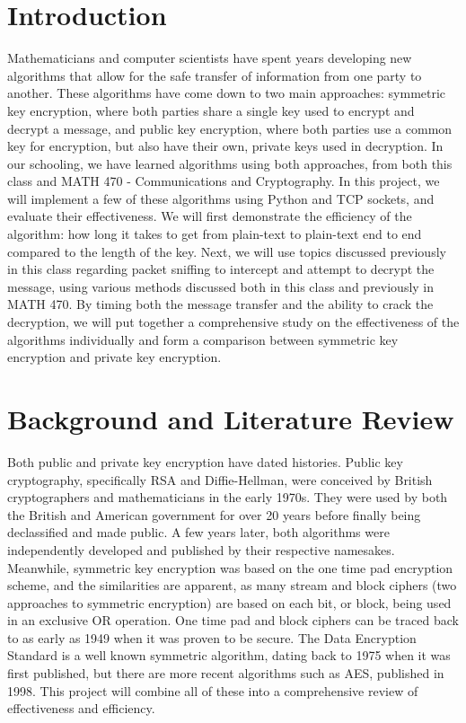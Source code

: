 \documentclass[12pt]{report}
\begin{document}
\section{Introduction}
Mathematicians and computer scientists have spent years developing new algorithms that allow for the safe transfer of information from one party to another. These algorithms have come down to two main approaches: symmetric key encryption, where both parties share a single key used to encrypt and decrypt a message, and public key encryption, where both parties use a common key for encryption, but also have their own, private keys used in decryption. In our schooling, we have learned algorithms using both approaches, from both this class and MATH 470 - Communications and Cryptography. In this project, we will implement a few of these algorithms using Python and TCP sockets, and evaluate their effectiveness. We will first demonstrate the efficiency of the algorithm: how long it takes to get from plain-text to plain-text end to end compared to the length of the key. Next, we will use topics discussed previously in this class regarding packet sniffing to intercept and attempt to decrypt the message, using various methods discussed both in this class and previously in MATH 470. By timing both the message transfer and the ability to crack the decryption, we will put together a comprehensive study on the effectiveness of the algorithms individually and form a comparison between symmetric key encryption and private key encryption.

\section{Background and Literature Review}
Both public and private key encryption have dated histories. Public key cryptography, specifically RSA and Diffie-Hellman, were conceived by British cryptographers and mathematicians in the early 1970s. They were used by both the British and American government for over 20 years before finally being declassified and made public. A few years later, both algorithms were independently developed and published by their respective namesakes. \\
Meanwhile, symmetric key encryption was based on the one time pad encryption scheme, and the similarities are apparent, as many stream and block ciphers (two approaches to symmetric encryption) are based on each bit, or block, being used in an exclusive OR operation. One time pad and block ciphers can be traced back to as early as 1949 when it was proven to be secure. The Data Encryption Standard is a well known symmetric algorithm, dating back to 1975 when it was first published, but there are more recent algorithms such as AES, published in 1998. This project will combine all of these into a comprehensive review of effectiveness and efficiency.
\end{document}
